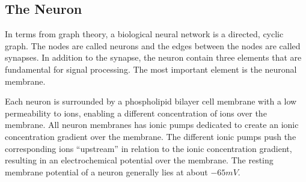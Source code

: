 	\subsection{The Neuron}
		In terms from graph theory, a biological neural network is a directed, cyclic graph.
		The nodes are called neurons and the edges between the nodes are called synapses.
		In addition to the synapse, the neuron contain three elements that are fundamental for signal processing.
		The most important element is the neuronal membrane. %

		



		Each neuron is surrounded by a phospholipid bilayer cell membrane with a low permeability to ions, enabling a different concentration of ions over the membrane.
		All neuron membranes has ionic pumps dedicated to create an ionic concentration gradient over the membrane.
		The different ionic pumps push the corresponding ions ``upstream'' in relation to the ionic concentration gradient, resulting in an electrochemical potential over the membrane.
		The resting membrane potential of a neuron generally lies at about $-65mV$. 
		\cite{NeuroscienceExploringTheBrain3edKAP3} %

